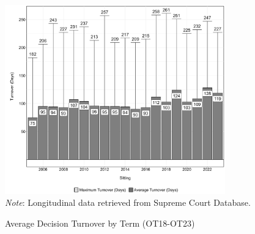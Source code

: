 \begin{landscape}
\newpage

\begin{figure}[H]
\centering
\caption{Average Decision Turnover by Term (OT18-OT23)}
\vspace{1.5mm}
\includegraphics[width = 0.85\textwidth]{Figures/statpack_figures/decision_turnover_OT18_OT23.png} \\
\vspace{1.5mm}
\footnotesize{\emph{Note}: Longitudinal data retrieved from Supreme Court Database.}

\end{figure}


\end{landscape}


